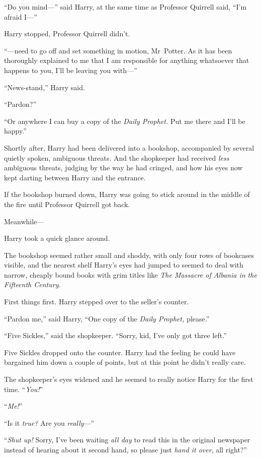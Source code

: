 “Do you mind—” said Harry, at the same time as Professor Quirrell said, “I’m afraid I—”

Harry stopped, Professor Quirrell didn’t.

“—need to go off and set something in motion, Mr~Potter. As it has been thoroughly explained to me that I am responsible for anything whatsoever that happens to you, I’ll be leaving you with—”

“News-stand,” Harry said.

“Pardon?”

“Or anywhere I can buy a copy of the \emph{Daily Prophet.} Put me there and I’ll be happy.”

Shortly after, Harry had been delivered into a bookshop, accompanied by several quietly spoken, ambiguous threats. And the shopkeeper had received \emph{less} ambiguous threats, judging by the way he had cringed, and how his eyes now kept darting between Harry and the entrance.

If the bookshop burned down, Harry was going to stick around in the middle of the fire until Professor Quirrell got back.

Meanwhile—

Harry took a quick glance around.

The bookshop seemed rather small and shoddy, with only four rows of bookcases visible, and the nearest shelf Harry’s eyes had jumped to seemed to deal with narrow, cheaply bound books with grim titles like \emph{The Massacre of Albania in the Fifteenth Century.}

First things first. Harry stepped over to the seller’s counter.

“Pardon me,” said Harry, “One copy of the \emph{Daily Prophet,} please.”

“Five Sickles,” said the shopkeeper. “Sorry, kid, I’ve only got three left.”

Five Sickles dropped onto the counter. Harry had the feeling he could have bargained him down a couple of points, but at this point he didn’t really care.

The shopkeeper’s eyes widened and he seemed to really notice Harry for the first time. “\emph{You!}”

“\emph{Me!}”

“Is it \emph{true?} Are you \emph{really}—”

“\emph{Shut up!} Sorry, I’ve been waiting \emph{all day} to read this in the original newspaper instead of hearing about it second hand, so please just \emph{hand it over}, all right?”

